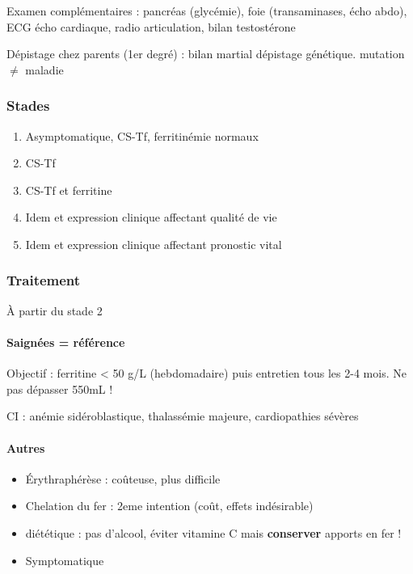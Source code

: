 \documentclass[11pt]{article}
\begin{document}
Examen complémentaires : pancréas (glycémie),  foie (transaminases, écho abdo), ECG \textpm{} écho
cardiaque, radio articulation, bilan testostérone

Dépistage chez parents (1er degré) : bilan martial \textpm{} dépistage génétique. \danger mutation \(\neq\) maladie

\subsubsection{Stades}
\label{sec:org6544224}
\begin{enumerate}
\item Asymptomatique, CS-Tf, ferritinémie normaux
\item CS-Tf \inc
\item CS-Tf \inc et ferritine \inc
\item Idem et expression clinique affectant qualité de vie
\item Idem et expression clinique affectant pronostic vital
\end{enumerate}

\subsubsection{Traitement}
\label{sec:orgc19e2e7}
À partir du stade 2

\paragraph{Saignées = référence}
\label{sec:org74b3b95}
Objectif : ferritine < 50 g/L (hebdomadaire) puis entretien tous les
  2-4 mois. Ne pas dépasser 550mL !

CI : anémie sidéroblastique, thalassémie majeure, cardiopathies sévères

\paragraph{Autres}
\label{sec:org035cfe2}
\begin{itemize}
\item Érythraphérèse : coûteuse, plus difficile
\item Chelation du fer : 2eme intention (coût, effets indésirable)
\item diététique : pas d'alcool, éviter vitamine C mais \textbf{conserver} apports en fer !
\item Symptomatique
\end{itemize}
\end{document}

